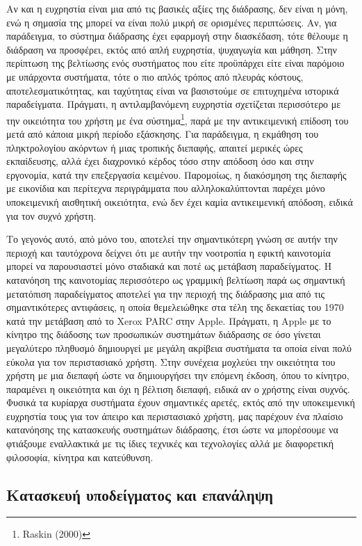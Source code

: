 \documentclass[
]{article}
\begin{document}
Αν και η ευχρηστία είναι μια από τις βασικές αξίες της διάδρασης, δεν
είναι η μόνη, ενώ η σημασία της μπορεί να είναι πολύ μικρή σε ορισμένες
περιπτώσεις. Αν, για παράδειγμα, το σύστημα διάδρασης έχει εφαρμογή στην
διασκέδαση, τότε θέλουμε η διάδραση να προσφέρει, εκτός από απλή
ευχρηστία, ψυχαγωγία και μάθηση. Στην περίπτωση της βελτίωσης ενός
συστήματος που είτε προϋπάρχει είτε είναι παρόμοιο με υπάρχοντα
συστήματα, τότε ο πιο απλός τρόπος από πλευράς κόστους,
αποτελεσματικότητας, και ταχύτητας είναι να βασιστούμε σε επιτυχημένα
ιστορικά παραδείγματα. Πράγματι, η αντιλαμβανόμενη ευχρηστία σχετίζεται
περισσότερο με την οικειότητα του χρήστη με ένα σύστημα\footnote{Raskin
  (2000)}, παρά με την αντικειμενική επίδοση του μετά από κάποια μικρή
περίοδο εξάσκησης. Για παράδειγμα, η εκμάθηση του πληκτρολογίου ακόρντων
ή μιας τροπικής διεπαφής, απαιτεί μερικές ώρες εκπαίδευσης, αλλά έχει
διαχρονικό κέρδος τόσο στην απόδοση όσο και στην εργονομία, κατά την
επεξεργασία κειμένου. Παρομοίως, η διακόσμηση της διεπαφής με εικονίδια
και περίτεχνα περιγράμματα που αλληλοκαλύπτονται παρέχει μόνο
υποκειμενική αισθητική οικειότητα, ενώ δεν έχει καμία αντικειμενική
απόδοση, ειδικά για τον συχνό χρήστη.

Το γεγονός αυτό, από μόνο του, αποτελεί την σημαντικότερη γνώση σε αυτήν
την περιοχή και ταυτόχρονα δείχνει ότι με αυτήν την νοοτροπία η εφικτή
καινοτομία μπορεί να παρουσιαστεί μόνο σταδιακά και ποτέ ως μετάβαση
παραδείγματος. Η κατανόηση της καινοτομίας περισσότερο ως γραμμική
βελτίωση παρά ως σημαντική μετατόπιση παραδείγματος αποτελεί για την
περιοχή της διάδρασης μια από τις σημαντικότερες αντιφάσεις, η οποία
θεμελειώθηκε στα τέλη της δεκαετίας του 1970 κατά την μετάβαση από το
Xerox PARC στην Apple. Πράγματι, η Apple με το κίνητρο της διάδοσης των
προσωπικών συστημάτων διάδρασης σε όσο γίνεται μεγαλύτερο πληθυσμό
δημιουργεί με μεγάλη ακρίβεια συστήματα τα οποία είναι πολύ εύκολα για
τον περιστασιακό χρήστη. Στην συνέχεια μοχλεύει την οικειότητα του
χρήστη με μια διεπαφή ώστε να δημιουργήσει την επόμενη έκδοση, όπου το
κίνητρο, παραμένει η οικειότητα και όχι η βέλτιση διεπαφή, ειδικά αν ο
χρήστης είναι συχνός. Φυσικά τα κυρίαρχα συστήματα έχουν σημαντικές
αρετές, εκτός από την υποκειμενική ευχρηστία τους για τον άπειρο και
περιστασιακό χρήστη, μας παρέχουν ένα πλαίσιο κατανόησης της κατασκευής
συστημάτων διάδρασης, έτσι ώστε να μπορέσουμε να φτιάξουμε εναλλακτικά
με τις ίδιες τεχνικές και τεχνολογίες αλλά με διαφορετική φιλοσοφία,
κίνητρα και κατεύθυνση.

\hypertarget{ux3baux3b1ux3c4ux3b1ux3c3ux3baux3b5ux3c5ux3ae-ux3c5ux3c0ux3bfux3b4ux3b5ux3afux3b3ux3bcux3b1ux3c4ux3bfux3c2-ux3baux3b1ux3b9-ux3b5ux3c0ux3b1ux3bdux3acux3bbux3b7ux3c8ux3b7}{%
\subsection{Κατασκευή υποδείγματος και
επανάληψη}\label{ux3baux3b1ux3c4ux3b1ux3c3ux3baux3b5ux3c5ux3ae-ux3c5ux3c0ux3bfux3b4ux3b5ux3afux3b3ux3bcux3b1ux3c4ux3bfux3c2-ux3baux3b1ux3b9-ux3b5ux3c0ux3b1ux3bdux3acux3bbux3b7ux3c8ux3b7}}
\end{document}
